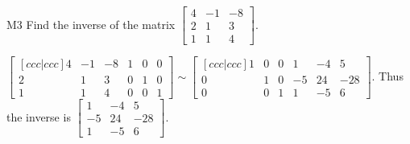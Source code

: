 \documentclass{sbgLAquiz}
\begin{document}
\begin{extract}\newpage\end{extract}
\begin{problem}{M3}
  Find the inverse of the matrix
  \(\begin{bmatrix}
    4 & -1 & -8  \\
    2 & 1 & 3  \\
    1 & 1 & 4
  \end{bmatrix}\).
\end{problem}
\begin{solution}
\(\begin{bmatrix}[ccc|ccc]
  4 & -1 & -8 & 1 & 0 & 0  \\
  2 & 1 & 3   & 0 & 1 & 0 \\
  1 & 1 & 4   & 0 & 0 & 1
\end{bmatrix}\sim\begin{bmatrix}[ccc|ccc]
  1 & 0 & 0 & 1 & -4 & 5 \\
  0 & 1 & 0 & -5 & 24 & -28 \\
  0 & 0 & 1 & 1 & -5 & 6
\end{bmatrix}\). Thus the inverse is
\(\begin{bmatrix}
  1 & -4 & 5  \\
  -5 & 24 & -28  \\
  1 & -5 & 6
\end{bmatrix}\).
\end{solution}
\end{document}
